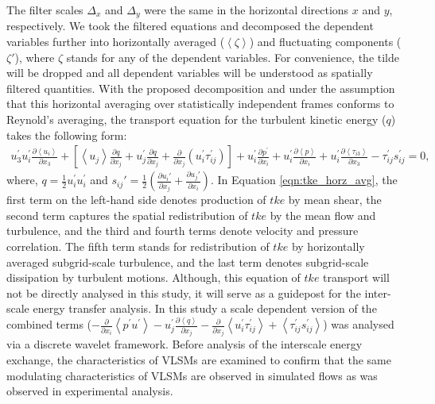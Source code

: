 The filter scales $\Delta_x$ and $\Delta_y$ were the same in the horizontal directions $x$ and $y$, respectively. We took the filtered equations and decomposed the dependent variables further into horizontally  averaged ($\left< \zeta \right>$) and fluctuating components ($\zeta\prime$), where $\zeta$ stands for any of the dependent variables. For convenience, the tilde will be dropped and all dependent variables will be understood as spatially filtered quantities. With the proposed decomposition and under the assumption that this horizontal averaging over statistically independent frames conforms to Reynold's averaging, the transport equation for the turbulent kinetic energy ($q$) takes the following form:
\begin{align}
u_3^\prime u_i^\prime \frac{\partial \left< u_i \right>}{\partial x_3}+[\left< u_j\right>\frac{\partial q}{\partial x_j}+u_j^\prime\frac{\partial q}{\partial x_j}+\frac{\partial }{\partial x_j}(u_i^\prime \tau_{ij}^\prime)]+u_i^\prime\frac{\partial p^\prime}{\partial x_i}+ u_i^\prime \frac{\partial \left < p \right >}{\partial x_i}+u_i^\prime\frac{\partial \left < \tau_{i3} \right >}{\partial x_3}-\tau_{ij}^\prime s_{ij}^\prime =0,
\label{eqn:tke_horz_avg}
\end{align}
\noindent where, $q=\frac{1}{2}u^{\prime}_i u^{\prime}_i$ and $s_{ij}'=\frac{1}{2}(\frac{\partial u_{i}'}{\partial x_j}+\frac{\partial u_{j}'}{\partial x_i})$.
In Equation \ref{eqn:tke_horz_avg}, the first term on the left-hand side denotes production of $tke$ by mean shear, the second term captures the spatial redistribution of $tke$ by the mean flow and turbulence, and the third and fourth terms denote velocity and pressure correlation.  The fifth term stands for redistribution of $tke$ by horizontally averaged subgrid-scale turbulence, and the last term denotes subgrid-scale dissipation by turbulent motions. Although, this equation of $tke$ transport will not be directly analysed in this study, it will serve as a guidepost for the inter-scale energy transfer analysis. In this study a scale dependent version of the combined terms ($-\frac{\partial }{\partial x_i}\left< p^\prime u^\prime\right>-u_j^\prime\frac{\partial \left< q\right>}{\partial x_j}-\frac{\partial}{\partial x_j}\left< u_i^\prime\tau_{ij}^\prime \right>+\left< \tau_{ij}^\prime s_{ij}^\prime\right>$) was analysed via a discrete wavelet framework. Before analysis of the interscale energy exchange, the characteristics of VLSMs are examined to confirm that the same modulating characteristics of VLSMs are observed in simulated flows as was observed in experimental analysis. 

